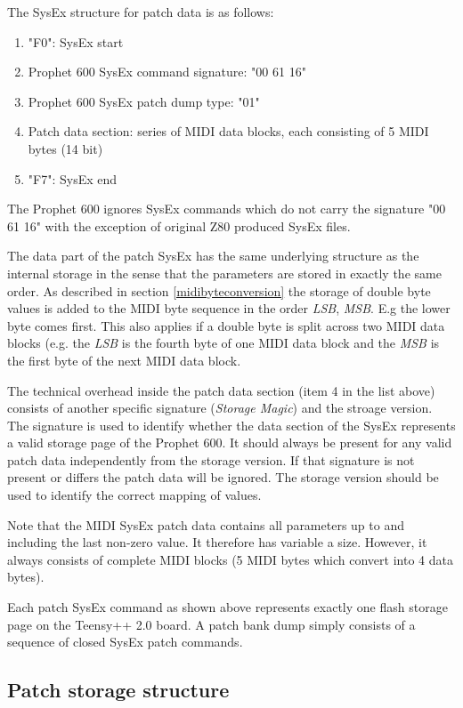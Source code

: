 The SysEx structure for patch data is as follows:

\begin{enumerate}
  \item "F0": SysEx start
  \item Prophet 600 SysEx command signature: "00 61 16"
  \item Prophet 600 SysEx patch dump type: "01"
  \item Patch data section: series of MIDI data blocks, each consisting of 5 MIDI bytes (14 bit) 
  \item "F7": SysEx end
\end{enumerate}

The Prophet 600 ignores SysEx commands which do not carry the signature "00 61 16" with the exception of original Z80 produced SysEx files.

The data part of the patch SysEx has the same underlying structure as the internal storage in the sense that the parameters are stored in exactly the same order. As described in section \ref{midibyteconversion} the storage of double  byte values is added to the MIDI byte sequence in the order \textit{LSB}, \textit{MSB}. E.g the lower byte comes first. This also applies if a double byte is split across two MIDI data blocks (e.g. the \textit{LSB} is the fourth byte of one MIDI data block and the \textit{MSB} is the first byte of the next MIDI data block. 

The technical overhead inside the patch data section (item 4 in the list above) consists of another specific signature (\textit{Storage Magic}) and the stroage version. The signature is used to identify whether the data section of the SysEx represents a valid storage page of the Prophet 600. It should  always be present for any valid patch data independently from the storage version. If that signature is not present or differs the patch data will be ignored. The storage version should be used to identify the correct mapping of values.  

Note that the MIDI SysEx patch data contains all parameters up to and including the last non-zero value. It therefore has variable a size. However, it always consists of complete MIDI blocks (5 MIDI bytes which convert into 4 data bytes).

Each patch SysEx command as shown above represents exactly one flash storage page on the Teensy++ 2.0 board. A patch bank dump simply consists of a sequence of closed SysEx patch commands.

\subsection{Patch storage structure}\label{patchstore}


